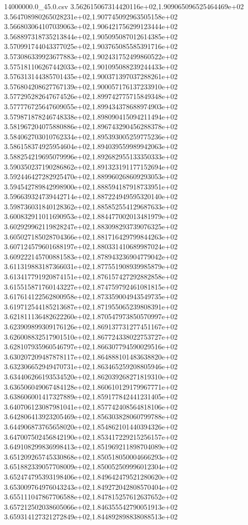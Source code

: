 \begin{filecontents*}{14000000.0_45.0.csv}
3.562615067314420116e+02,1.909065096525464469e+02
3.564708980265028231e+02,1.907745092963505158e+02
3.566803064107039063e+02,1.906421756299123444e+02
3.568897318735213844e+02,1.905095087012614385e+02
3.570991744043377025e+02,1.903765085585391716e+02
3.573086339923677883e+02,1.902431752499860522e+02
3.575181106267442033e+02,1.901095088239244433e+02
3.576313144385701435e+02,1.900371397037288261e+02
3.576804208627767139e+02,1.900057176137233910e+02
3.577295282647674526e+02,1.899742775715849348e+02
3.577776725647609055e+02,1.899434378688974903e+02
3.579871878246748338e+02,1.898090415094211494e+02
3.581967204075880886e+02,1.896743290456288378e+02
3.584062703010762334e+02,1.895393005259775236e+02
3.586158374925954604e+02,1.894039559989942063e+02
3.588254219695079996e+02,1.892682955133350333e+02
3.590350237190286862e+02,1.891323191177152694e+02
3.592446427282925470e+02,1.889960268609293053e+02
3.594542789842998900e+02,1.888594187918733951e+02
3.596639324739442714e+02,1.887224949595320140e+02
3.598736031840128362e+02,1.885852554129687633e+02
3.600832911011690953e+02,1.884477002013481979e+02
3.602929962119828247e+02,1.883098293739076325e+02
3.605027185028704366e+02,1.881716429799844263e+02
3.607124579601688197e+02,1.880331410689987024e+02
3.609222145700881583e+02,1.878943236904779042e+02
3.611319883187366031e+02,1.877551908939985879e+02
3.613417791920874151e+02,1.876157427292882858e+02
3.615515871760143227e+02,1.874759792461081815e+02
3.617614122562800958e+02,1.873359004943549735e+02
3.619712544185213687e+02,1.871955065239808391e+02
3.621811136482622260e+02,1.870547973850570997e+02
3.623909899309176126e+02,1.869137731277451167e+02
3.626008832517901510e+02,1.867724338022753727e+02
3.628107935960546797e+02,1.866307794590029516e+02
3.630207209487878117e+02,1.864888101483638820e+02
3.632306652949470731e+02,1.863465259208805946e+02
3.634406266193534520e+02,1.862039268271819310e+02
3.636506049067484128e+02,1.860610129179967771e+02
3.638606001417327889e+02,1.859177842441231405e+02
3.640706123087981041e+02,1.857742408564818106e+02
3.642806413923205469e+02,1.856303828060799788e+02
3.644906873765658020e+02,1.854862101440394326e+02
3.647007502456842190e+02,1.853417229215256157e+02
3.649108299836998413e+02,1.851969211898704089e+02
3.651209265745330868e+02,1.850518050004666293e+02
3.651882339057708009e+02,1.850052509996012304e+02
3.652474795393198406e+02,1.849642479521280620e+02
3.653009764976043243e+02,1.849272042808570404e+02
3.655111047867706588e+02,1.847815257612637652e+02
3.657212502038605066e+02,1.846355542790051913e+02
3.659314127321272849e+02,1.844892898838088513e+02

\end{filecontents*}
